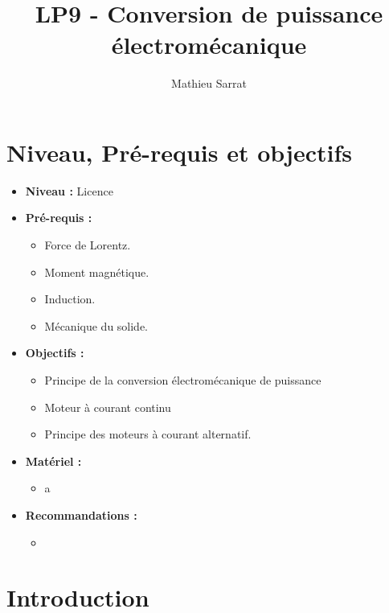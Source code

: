 \documentclass[11pt,a4paper]{report}
\author{Mathieu Sarrat}
\title{LP9 - Conversion de puissance électromécanique}
\begin{document}
\maketitle

\section*{Niveau, Pré-requis et objectifs}
\begin{itemize}
	\item \textbf{Niveau :} Licence\\
	
	\item \textbf{Pré-requis :}
	\begin{itemize}
		\item Force de Lorentz.
		\item Moment magnétique.
		\item Induction.
		\item Mécanique du solide.\\
	\end{itemize}
	
	\item \textbf{Objectifs :}
	\begin{itemize}
		\item Principe de la conversion électromécanique de puissance
		\item Moteur à courant continu
		\item Principe des moteurs à courant alternatif.\\
	\end{itemize}
		
	\item \textbf{Matériel :}
	\begin{itemize}
		\item a\\
	\end{itemize}
		
	\item \textbf{Recommandations :}
	\begin{itemize}
		\item 
	\end{itemize}
\end{itemize}

\newpage
\section*{Introduction}
\end{document}
